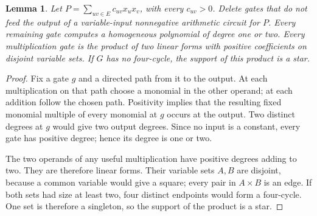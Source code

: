 \documentclass[11pt]{article}
\newtheorem{lemma}[theorem]{Lemma}
\theoremstyle{definition}
\theoremstyle{remark}
\begin{document}
\begin{lemma}\label{lem:quadstructure}
Let $P=\sum_{uv\in E}c_{uv}x_ux_v$, with every $c_{uv}>0$. Delete gates that do not feed the output of a variable-input nonnegative arithmetic circuit for $P$. Every remaining gate computes a homogeneous polynomial of degree one or two. Every multiplication gate is the product of two linear forms with positive coefficients on disjoint variable sets. If $G$ has no four-cycle, the support of this product is a star.
\end{lemma}
\begin{proof}
Fix a gate $g$ and a directed path from it to the output. At each multiplication on that path choose a monomial in the other operand; at each addition follow the chosen path. Positivity implies that the resulting fixed monomial multiple of every monomial at $g$ occurs at the output. Two distinct degrees at $g$ would give two output degrees. Since no input is a constant, every gate has positive degree; hence its degree is one or two.

The two operands of any useful multiplication have positive degrees adding to two. They are therefore linear forms. Their variable sets $A,B$ are disjoint, because a common variable would give a square; every pair in $A\times B$ is an edge. If both sets had size at least two, four distinct endpoints would form a four-cycle. One set is therefore a singleton, so the support of the product is a star.
\end{proof}
\end{document}
